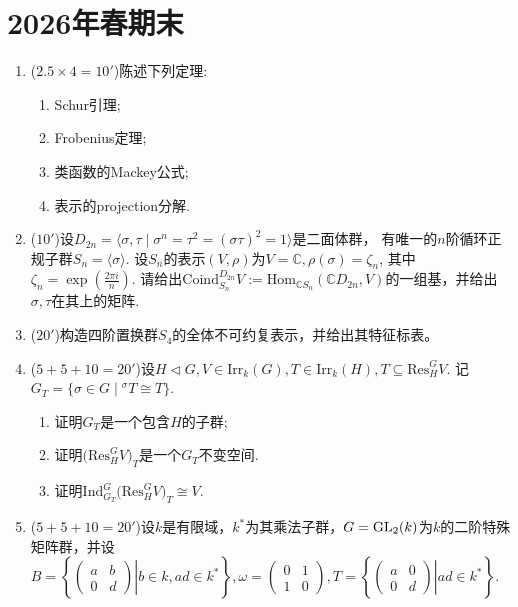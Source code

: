 \section{2026年春期末}
\begin{enumerate}
\item[一] ($2.5\times 4=10'$)陈述下列定理:
\begin{enumerate}
    \item Schur引理;
    \item Frobenius定理;
    \item 类函数的Mackey公式;
    \item 表示的projection分解.
\end{enumerate}
\item[二] ($10'$)设$D_{2n}=\langle\sigma,\tau\mid\sigma^n=\tau^2=(\sigma\tau)^2=1\rangle$是二面体群，
有唯一的$n$阶循环正规子群$S_n=\langle\sigma\rangle$. 
设$S_n$的表示$(V,\rho)$为$V=\mathbb{C}, \rho(\sigma)=\zeta_n$, 
其中$\zeta_n=\exp\left(\frac{2\pi i}{n}\right)$.
请给出$\text{Coind}_{S_{n}}^{D_{2n}}V:=\text{Hom}_{\mathbb{C}S_n}(\mathbb{C}D_{2n},V)$的一组基，并给出$\sigma,\tau$在其上的矩阵.
\item[三] ($20'$)构造四阶置换群$S_4$的全体不可约复表示，并给出其特征标表。
\item[四] ($5+5+10=20'$)设$H\lhd G, V\in\text{Irr}_k(G), T\in\text{Irr}_k(H), T\subseteq\text{Res}_H^GV$.
记$G_T=\{\sigma\in G\mid{ }^\sigma T\cong T\}$.
\begin{enumerate}
    \item 证明$G_T$是一个包含$H$的子群;
    \item 证明$\big(\text{Res}_H^GV\big)_T$是一个$G_T$不变空间.
    \item 证明$\text{Ind}_{G_T}^G\big(\text{Res}_H^GV\big)_T\cong V$.
\end{enumerate}
\item[五] ($5+5+10=20'$)设$k$是有限域，$k^*$为其乘法子群，$G={\rm GL}_2(k)$为$k$的二阶特殊矩阵群，并设
$B=\left\{\left.\begin{pmatrix}
    a&b\\0&d
\end{pmatrix}\right|b\in k, ad\in k^*\right\},\omega=\begin{pmatrix}
    0&1\\1&0
\end{pmatrix},T=\left\{\left.\begin{pmatrix}
    a&0\\0&d
\end{pmatrix}\right|ad\in k^*\right\}.$
\begin{enumerate}

\end{enumerate}
\end{enumerate}
